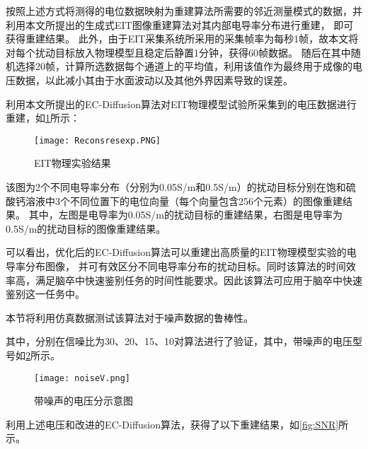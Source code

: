 按照上述方式将测得的电位数据映射为重建算法所需要的邻近测量模式的数据，并利用本文所提出的生成式EIT图像重建算法对其内部电导率分布进行重建，
即可获得重建结果。
此外，由于EIT采集系统所采用的采集帧率为每秒1帧，故本文将对每个扰动目标放入物理模型且稳定后静置1分钟，获得60帧数据。
随后在其中随机选择20帧，计算所选数据每个通道上的平均值，利用该值作为最终用于成像的电压数据，以此减小其由于水面波动以及其他外界因素导致的误差。


利用本文所提出的EC-Diffusion算法对EIT物理模型试验所采集到的电压数据进行重建，如\cref{figure:Reconsresexp}所示：

\begin{figure}[H]
    \centering
    \texttt{[image: Reconsresexp.PNG]}
    \caption{EIT物理实验结果}
    \label{figure:Reconsresexp}
\end{figure}
该图为2个不同电导率分布（分别为0.05S/m和0.5S/m）的扰动目标分别在饱和硫酸钙溶液中3个不同位置下的电位向量（每个向量包含256个元素）的图像重建结果。
其中，左图是电导率为0.05S/m的扰动目标的重建结果，右图是电导率为0.5S/m的扰动目标的图像重建结果。

可以看出，优化后的EC-Diffusion算法可以重建出高质量的EIT物理模型实验的电导率分布图像，
并可有效区分不同电导率分布的扰动目标。同时该算法的时间效率高，满足脑卒中快速鉴别任务的时间性能要求。因此该算法可应用于脑卒中快速鉴别这一任务中。

\label{NoiseRob}
本节将利用仿真数据测试该算法对于噪声数据的鲁棒性。

其中，分别在信噪比为30、20、15、10对算法进行了验证，其中，带噪声的电压型号如\cref{figure:noiseV}所示。


\begin{figure}[H]
    \centering
    \texttt{[image: noiseV.png]}
    \caption{带噪声的电压分示意图}
    \label{figure:noiseV}
\end{figure}

利用上述电压和改进的EC-Diffusion算法，获得了以下重建结果，如\cref{fig:SNR}所示。


\newcommand{\subfigg}{
\begin{subfigure}[b]{0.8\linewidth}
\centering
\texttt{[image: SNR30.png]}
\subcaption{信噪比为30时的重建结果}
\end{subfigure}
}

